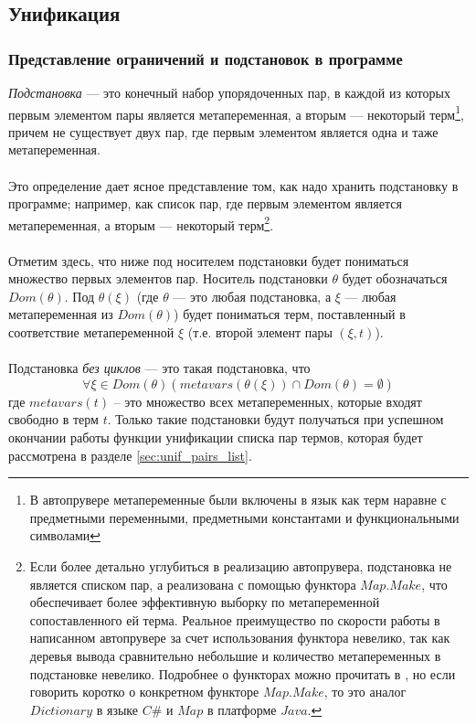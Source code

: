 \documentclass{cw1}
\begin{document}
\subsection{Унификация}
\subsubsection{Представление ограничений и подстановок в программе}
\label{sec:subs_and_forbs}
\textit{Подстановка} --- это конечный набор упорядоченных пар, в каждой из которых первым элементом пары является
метапеременная, а вторым --- некоторый терм\footnote{В автопрувере метапеременные были включены в
язык как терм наравне с предметными переменными,
предметными константами и функциональными символами}, причем не существует двух пар, где первым
элементом является одна и таже метапеременная.
\paragraph{}
Это определение дает ясное представление  том, как надо хранить подстановку в программе; например,
как список пар, где первым элементом является метапеременная, а вторым --- некоторый терм\footnote{Если более детально углубиться в реализацию автопрувера, подстановка не является списком пар,
а реализована с помощью функтора $Map.Make$, что обеспечивает более эффективную выборку по
метапеременной сопоставленного ей терма. Реальное преимущество по скорости работы в
написанном автопрувере за счет использования функтора невелико, так как деревья вывода
сравнительно небольшие и количество метапеременных в подстановке невелико. Подробнее о функторах
можно прочитать в \cite{OCamlManual}, но если говорить коротко о конкретном функторе $Map.Make$,
то это аналог $Dictionary$ в языке $C\#$ и $Map$ в платформе $Java$.}.

\paragraph{}
Отметим здесь, что ниже под носителем подстановки будет пониматься множество первых элементов пар.
Носитель подстановки $\theta$ будет обозначаться $Dom(\theta)$.
Под $\theta(\xi)$ (где $\theta$ --- это любая подстановка, а $\xi$ --- любая метапеременная из
$Dom(\theta)$) будет
пониматься терм, поставленный в соответствие метапеременной $\xi$ (т.е. второй элемент
пары $(\xi,t)$).
\paragraph{}
Подстановка \textit{без циклов} --- это такая подстановка, что
$$
\forall\xi\in Dom(\theta) (metavars(\theta(\xi))\cap Dom(\theta)=\emptyset)
$$
где
$metavars(t)$ -- это множество всех метапеременных, которые входят свободно в терм $t$. Только такие подстановки
будут получаться при успешном окончании работы функции унификации списка пар термов, которая
будет рассмотрена в разделе \ref{sec:unif_pairs_list}.
\end{document}
